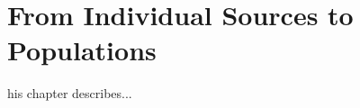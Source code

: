 \chapter{From Individual Sources to Populations}
\label{chap:populations}

his chapter describes...

